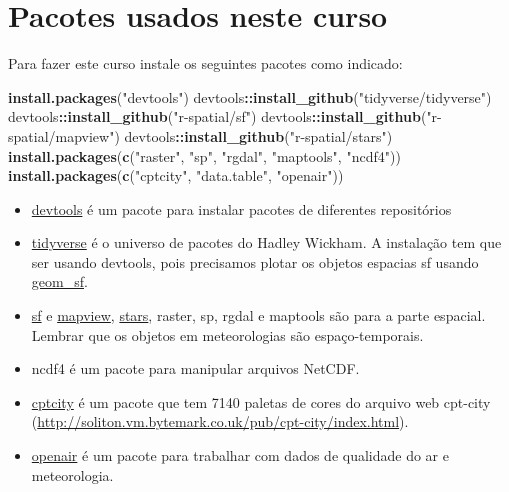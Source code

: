 \documentclass[]{book}
\newenvironment{Shaded}{\begin{snugshade}}{\end{snugshade}}
\newcommand{\KeywordTok}[1]{\textcolor[rgb]{0.13,0.29,0.53}{\textbf{#1}}}
\newcommand{\StringTok}[1]{\textcolor[rgb]{0.31,0.60,0.02}{#1}}
\newcommand{\OperatorTok}[1]{\textcolor[rgb]{0.81,0.36,0.00}{\textbf{#1}}}
\newcommand{\NormalTok}[1]{#1}
\providecommand{\tightlist}{%
  \setlength{\itemsep}{0pt}\setlength{\parskip}{0pt}}
\theoremstyle{definition}
\theoremstyle{definition}
\theoremstyle{definition}
\theoremstyle{remark}
\begin{document}
\section{Pacotes usados neste curso}\label{pacotes-usados-neste-curso}

Para fazer este curso instale os seguintes pacotes como indicado:

\begin{Shaded}
\begin{Highlighting}[]
\KeywordTok{install.packages}\NormalTok{(}\StringTok{"devtools"}\NormalTok{)}
\NormalTok{devtools}\OperatorTok{::}\KeywordTok{install_github}\NormalTok{(}\StringTok{"tidyverse/tidyverse"}\NormalTok{)}
\NormalTok{devtools}\OperatorTok{::}\KeywordTok{install_github}\NormalTok{(}\StringTok{"r-spatial/sf"}\NormalTok{)}
\NormalTok{devtools}\OperatorTok{::}\KeywordTok{install_github}\NormalTok{(}\StringTok{"r-spatial/mapview"}\NormalTok{)}
\NormalTok{devtools}\OperatorTok{::}\KeywordTok{install_github}\NormalTok{(}\StringTok{"r-spatial/stars"}\NormalTok{)}
\KeywordTok{install.packages}\NormalTok{(}\KeywordTok{c}\NormalTok{(}\StringTok{"raster"}\NormalTok{, }\StringTok{"sp"}\NormalTok{, }\StringTok{"rgdal"}\NormalTok{, }\StringTok{"maptools"}\NormalTok{, }\StringTok{"ncdf4"}\NormalTok{))}
\KeywordTok{install.packages}\NormalTok{(}\KeywordTok{c}\NormalTok{(}\StringTok{"cptcity"}\NormalTok{, }\StringTok{"data.table"}\NormalTok{, }\StringTok{"openair"}\NormalTok{))}
\end{Highlighting}
\end{Shaded}

\begin{itemize}
\tightlist
\item
  \href{https://CRAN.R-project.org/package=devtools}{devtools} é um
  pacote para instalar pacotes de diferentes repositórios
\item
  \href{https://github.com/tidyverse}{tidyverse} é o universo de pacotes
  do Hadley Wickham. A instalação tem que ser usando devtools, pois
  precisamos plotar os objetos espacias sf usando
  \href{https://www.isgeomsfinggplot2yet.site/}{geom\_sf}.
\item
  \href{https://github.com/r-spatial/sf}{sf} e
  \href{https://github.com/r-spatial/mapbiew}{mapview},
  \href{https://github.com/r-spatial/stars}{stars}, raster, sp, rgdal e
  maptools são para a parte espacial. Lembrar que os objetos em
  meteorologias são espaço-temporais.
\item
  ncdf4 é um pacote para manipular arquivos NetCDF.
\item
  \href{https://ibarraespinosa.github.io/cptcity/}{cptcity} é um pacote
  que tem 7140 paletas de cores do arquivo web cpt-city
  (\url{http://soliton.vm.bytemark.co.uk/pub/cpt-city/index.html}).
\item
  \href{http://davidcarslaw.github.io/openair/}{openair} é um pacote
  para trabalhar com dados de qualidade do ar e meteorologia.
\end{itemize}
\end{document}

